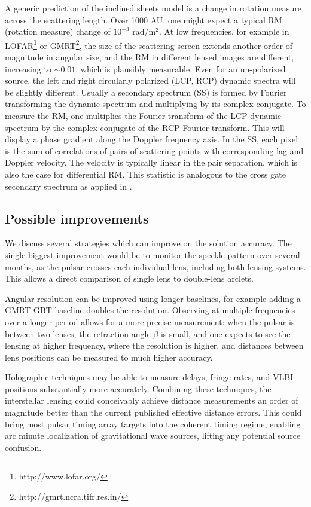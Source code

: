 \documentclass[useAMS,usenatbib]{mn2e}
\begin{document}
A generic prediction of the inclined sheets model is a change in rotation
measure across the scattering length.  Over 1000 AU, one might expect
a typical RM (rotation measure) change of $10^{-3}$ rad/m$^2$.  At low frequencies, for
example in LOFAR\footnote{http://www.lofar.org/} or GMRT\footnote{http://gmrt.ncra.tifr.res.in/}, the size of the scattering screen extends
another order of magnitude in angular size, and the RM in different
lensed images are different, increasing to 
$\sim 0.01$, which is plausibly measurable.  Even for an un-polarized
source, the left and right circularly polarized (LCP, RCP) dynamic spectra will
be slightly different.  Usually a secondary spectrum (SS) is formed by
Fourier transforming the dynamic spectrum and multiplying by its
complex conjugate.  To measure the RM, one multiplies the Fourier
transform of the LCP dynamic spectrum by the complex conjugate of the
RCP Fourier transform.  This will display a phase gradient along the Doppler
frequency axis.  In the SS, each pixel is the sum of correlations of
pairs of scattering points with corresponding lag and Doppler
velocity.  The velocity is typically linear in the pair separation,
which is also the case for differential RM.   This statistic is
analogous to the cross gate secondary spectrum as applied in
\citet{2014MNRAS.440L..36P}. 

\subsection{Possible improvements}

We discuss several strategies which can improve on the solution
accuracy.  The single biggest improvement would be to monitor the speckle pattern over
several months, as the pulsar crosses each individual lens,
including both lensing systems.  This allows a direct comparison of
single lens to double-lens arclets.

Angular resolution can be improved using longer baselines, for example
adding a GMRT-GBT baseline doubles the resolution.  Observing at
multiple frequencies over a longer period allows for a more precise
measurement: when the pulsar is between two lenses, the refraction
angle $\beta$ is small, and one expects to see the lensing at higher
frequency, where the resolution is higher, and distances between
lens positions can be measured to much higher accuracy.

Holographic techniques \citep{2008MNRAS.388.1214W,2014MNRAS.440L..36P}
may be able to measure delays, fringe rates, and VLBI positions
substantially more accurately.  Combining these techniques, the
interstellar lensing could conceivably achieve distance measurements
an order of magnitude better than the current published effective
distance errors.  This could bring most pulsar timing array targets
into the coherent timing regime, enabling arc minute localization of
gravitational wave sources, lifting any potential source confusion.
\end{document}
